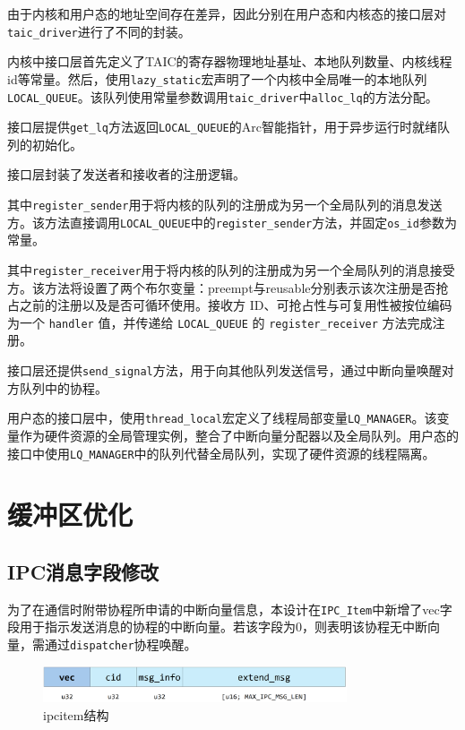 由于内核和用户态的地址空间存在差异，因此分别在用户态和内核态的接口层对\texttt{taic\_driver}进行了不同的封装。

内核中接口层首先定义了TAIC的寄存器物理地址基址、本地队列数量、内核线程id等常量。然后，使用\texttt{lazy\_static}宏声明了一个内核中全局唯一的本地队列\texttt{LOCAL\_QUEUE}。该队列使用常量参数调用\texttt{taic\_driver}中\texttt{alloc\_lq}的方法分配。

接口层提供\texttt{get\_lq}方法返回\texttt{LOCAL\_QUEUE}的Arc智能指针，用于异步运行时就绪队列的初始化。

接口层封装了发送者和接收者的注册逻辑。

其中\texttt{register\_sender}用于将内核的队列的注册成为另一个全局队列的消息发送方。该方法直接调用\texttt{LOCAL\_QUEUE}中的\texttt{register\_sender}方法，并固定\texttt{os\_id}参数为常量。

其中\texttt{register\_receiver}用于将内核的队列的注册成为另一个全局队列的消息接受方。该方法将设置了两个布尔变量：preempt与reusable分别表示该次注册是否抢占之前的注册以及是否可循环使用。接收方 ID、可抢占性与可复用性被按位编码为一个 \texttt{handler} 值，并传递给 \texttt{LOCAL\_QUEUE} 的 \texttt{register\_receiver} 方法完成注册。

接口层还提供\texttt{send\_signal}方法，用于向其他队列发送信号，通过中断向量唤醒对方队列中的协程。

用户态的接口层中，使用\texttt{thread\_local}宏定义了线程局部变量\texttt{LQ\_MANAGER}。该变量作为硬件资源的全局管理实例，整合了中断向量分配器以及全局队列。用户态的接口中使用\texttt{LQ\_MANAGER}中的队列代替全局队列，实现了硬件资源的线程隔离。

\section{缓冲区优化}

\subsection{IPC消息字段修改}

为了在通信时附带协程所申请的中断向量信息，本设计在\texttt{IPC\_Item}中新增了vec字段用于指示发送消息的协程的中断向量。若该字段为0，则表明该协程无中断向量，需通过\texttt{dispatcher}协程唤醒。

\begin{figure}[htbp]
  \centering
  \includegraphics[width=0.8\textwidth]{images/ipc_item.png}
  \caption{ipcitem结构}\label{ipc_item结构}
\end{figure}

